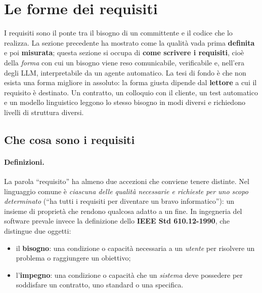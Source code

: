 \documentclass[12pt]{extarticle}
\begin{document}

\newpage

\section{Le forme dei requisiti}\label{sec:forme-requisiti}

\noindent I requisiti sono il ponte tra il bisogno di un committente e il codice che lo realizza. La sezione precedente ha mostrato come la qualità vada prima \textbf{definita} e poi \textbf{misurata}; questa sezione si occupa di \textbf{come scrivere i requisiti}, cioè della \textit{forma} con cui un bisogno viene reso comunicabile, verificabile e, nell'era degli LLM, interpretabile da un agente automatico. La tesi di fondo è che non esista una forma migliore in assoluto: la forma giusta dipende dal \textbf{lettore} a cui il requisito è destinato. Un contratto, un colloquio con il cliente, un test automatico e un modello linguistico leggono lo stesso bisogno in modi diversi e richiedono livelli di struttura diversi.

\subsection{Che cosa sono i requisiti}

\paragraph{Definizioni.}
La parola ``requisito'' ha almeno due accezioni che conviene tenere distinte. Nel linguaggio comune è \textit{ciascuna delle qualità necessarie e richieste per uno scopo determinato} (``ha tutti i requisiti per diventare un bravo informatico''): un insieme di proprietà che rendono qualcosa adatto a un fine. In ingegneria del software prevale invece la definizione dello \textbf{IEEE Std 610.12-1990}, che distingue due oggetti:

\begin{itemize}
    \item il \textbf{bisogno}: una condizione o capacità necessaria a un \textit{utente} per risolvere un problema o raggiungere un obiettivo;
    \item l'\textbf{impegno}: una condizione o capacità che un \textit{sistema} deve possedere per soddisfare un contratto, uno standard o una specifica.
\end{itemize}
\end{document}
